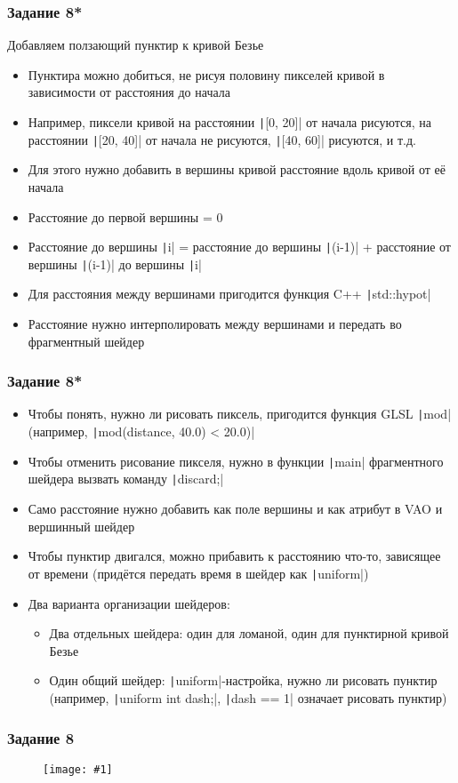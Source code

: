 \documentclass[10pt]{beamer}
\newcommand{\slideimage}[1]{
  \begin{figure}
    \begin{adjustbox}{width=\textwidth, totalheight=\textheight-2\baselineskip-2\baselineskip,keepaspectratio}
      \texttt{[image: \#1]}
    \end{adjustbox}
  \end{figure}
}
\begin{document}
\begin{frame}[fragile]
\frametitle{Задание 8*}
Добавляем ползающий пунктир к кривой Безье
\begin{itemize}
\item Пунктира можно добиться, не рисуя половину пикселей кривой в зависимости от расстояния до начала
\item Например, пиксели кривой на расстоянии \texttt|[0, 20]| от начала рисуются, на расстоянии \texttt|[20, 40]| от начала не рисуются, \texttt|[40, 60]| рисуются, и т.д.
\item Для этого нужно добавить в вершины кривой расстояние вдоль кривой от её начала
\item Расстояние до первой вершины = 0
\item Расстояние до  вершины \texttt|i| = расстояние до  вершины \texttt|(i-1)| + расстояние от вершины \texttt|(i-1)| до вершины \texttt|i|
\item Для расстояния между вершинами пригодится функция C++ \texttt|std::hypot|
\item Расстояние нужно интерполировать между вершинами и передать во фрагментный шейдер
\end{itemize}
\end{frame}

\begin{frame}[fragile]
\frametitle{Задание 8*}
\begin{itemize}
\item Чтобы понять, нужно ли рисовать пиксель, пригодится функция GLSL \texttt|mod| (например, \texttt|mod(distance, 40.0) < 20.0)|
\item Чтобы отменить рисование пикселя, нужно в функции \texttt|main| фрагментного шейдера вызвать команду \texttt|discard;|
\item Само расстояние нужно добавить как поле вершины и как атрибут в VAO и вершинный шейдер
\item Чтобы пунктир двигался, можно прибавить к расстоянию что-то, зависящее от времени (придётся передать время в шейдер как \texttt|uniform|)
\item Два варианта организации шейдеров:
\begin{itemize}
\item Два отдельных шейдера: один для ломаной, один для пунктирной кривой Безье
\item Один общий шейдер: \texttt|uniform|-настройка, нужно ли рисовать пунктир (например, \texttt|uniform int dash;|, \texttt|dash == 1| означает рисовать пунктир)
\end{itemize}
\end{itemize}
\end{frame}

\begin{frame}
\frametitle{Задание 8}
\slideimage{8.png}
\end{frame}
\end{document}
